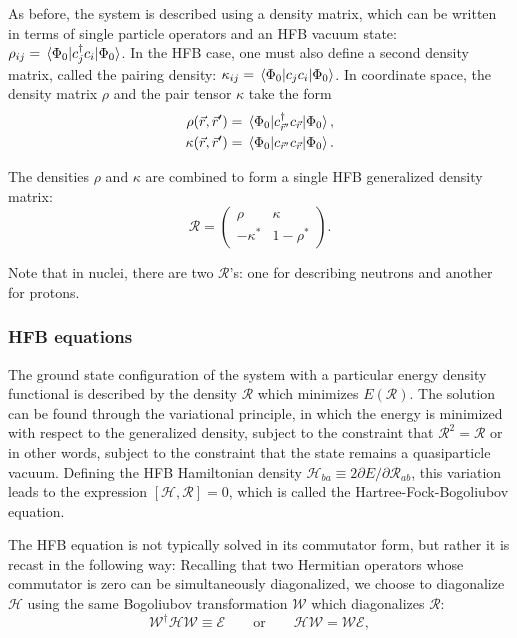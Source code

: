 As before, the system is described using a density matrix, which can be written in terms of single particle operators and an HFB vacuum state: $\rho_{ij} = \expval{c_j^\dagger c_i}{\Phi_0}$. In the HFB case, one must also define a second density matrix, called the pairing density: $\kappa_{ij} = \expval{c_jc_i}{\Phi_0}$. %
In coordinate space, the density matrix $\rho$ and the pair tensor $\kappa$ take the form
\begin{align}
\rho(\vec{r},\vec{r}') &= \expval{c_{\vec{r}'}^\dagger c_{\vec{r}}}{\Phi_0}, \\
\kappa(\vec{r},\vec{r}') &= \expval{c_{\vec{r}'} c_{\vec{r}}}{\Phi_0}.
\end{align}

\noindent The densities $\rho$ and $\kappa$ are combined to form a single HFB generalized density matrix:
\begin{equation}
\mathcal{R} = \left(\begin{array}{cc}
\rho & \kappa \\
-\kappa^* & 1-\rho^*
\end{array}\right).
\end{equation}

\noindent Note that in nuclei, there are two $\mathcal{R}$'s: one for describing neutrons and another for protons.

\subsubsection{HFB equations}

The ground state configuration of the system with a particular energy density functional is described by the density $\mathcal{R}$ which minimizes $E(\mathcal{R})$. The solution can be found through the variational principle, in which the energy is minimized with respect to the generalized density, subject to the constraint that $\mathcal{R}^2=\mathcal{R}$ \textminus or in other words, subject to the constraint that the state remains a quasiparticle vacuum. Defining the HFB Hamiltonian density $\mathcal{H}_{ba} \equiv 2 \partial E/\partial \mathcal{R}_{ab}$, this variation leads to the expression $\left[\mathcal{H},\mathcal{R}\right]=0$, which is called the Hartree-Fock-Bogoliubov equation.

The HFB equation is not typically solved in its commutator form, but rather it is recast in the following way: Recalling that two Hermitian operators whose commutator is zero can be simultaneously diagonalized, we choose to diagonalize $\mathcal{H}$ using the same Bogoliubov transformation $\mathcal{W}$ which diagonalizes $\mathcal{R}$:
\begin{equation}
\mathcal{W}^\dagger \mathcal{H} \mathcal{W} \equiv \mathcal{E} \qquad\mathrm{or}\qquad \mathcal{H}\mathcal{W} = \mathcal{W}\mathcal{E},
\end{equation}


